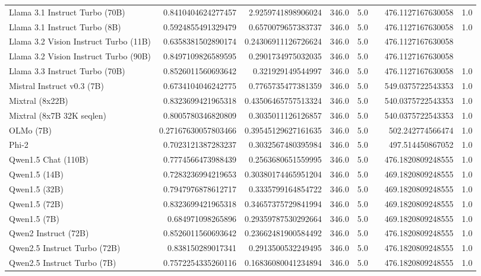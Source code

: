 \begin{table}[htp]
{\begin{tabular}{lrrrrrrr}
Llama 3.1 Instruct Turbo (70B) & 0.8410404624277457 & 2.9259741898906024 & 346.0 & 5.0 &  & 476.1127167630058 & 1.0 \\
Llama 3.1 Instruct Turbo (8B) & 0.5924855491329479 & 0.6570079657383737 & 346.0 & 5.0 &  & 476.1127167630058 & 1.0 \\
Llama 3.2 Vision Instruct Turbo (11B) & 0.6358381502890174 & 0.24306911126726624 & 346.0 & 5.0 &  & 476.1127167630058 &  \\
Llama 3.2 Vision Instruct Turbo (90B) & 0.8497109826589595 & 0.2901734975032035 & 346.0 & 5.0 &  & 476.1127167630058 &  \\
Llama 3.3 Instruct Turbo (70B) & 0.8526011560693642 & 0.321929149544997 & 346.0 & 5.0 &  & 476.1127167630058 & 1.0 \\
Mistral Instruct v0.3 (7B) & 0.6734104046242775 & 0.7765735477381359 & 346.0 & 5.0 &  & 549.0375722543353 & 1.0 \\
Mixtral (8x22B) & 0.8323699421965318 & 0.43506465757513324 & 346.0 & 5.0 &  & 540.0375722543353 & 1.0 \\
Mixtral (8x7B 32K seqlen) & 0.8005780346820809 & 0.3035011126126857 & 346.0 & 5.0 &  & 540.0375722543353 & 1.0 \\
OLMo (7B) & 0.27167630057803466 & 0.39545129627161635 & 346.0 & 5.0 &  & 502.242774566474 & 1.0 \\
Phi-2 & 0.7023121387283237 & 0.3032567480395984 & 346.0 & 5.0 &  & 497.514450867052 & 1.0 \\
Qwen1.5 Chat (110B) & 0.7774566473988439 & 0.2563680651559995 & 346.0 & 5.0 &  & 476.1820809248555 & 1.0 \\
Qwen1.5 (14B) & 0.7283236994219653 & 0.30380174465951204 & 346.0 & 5.0 &  & 469.1820809248555 & 1.0 \\
Qwen1.5 (32B) & 0.7947976878612717 & 0.3335799164854722 & 346.0 & 5.0 &  & 469.1820809248555 & 1.0 \\
Qwen1.5 (72B) & 0.8323699421965318 & 0.34657375729841994 & 346.0 & 5.0 &  & 469.1820809248555 & 1.0 \\
Qwen1.5 (7B) & 0.684971098265896 & 0.29359787530292664 & 346.0 & 5.0 &  & 469.1820809248555 & 1.0 \\
Qwen2 Instruct (72B) & 0.8526011560693642 & 0.23662481900584492 & 346.0 & 5.0 &  & 476.1820809248555 & 1.0 \\
Qwen2.5 Instruct Turbo (72B) & 0.838150289017341 & 0.2913500532249495 & 346.0 & 5.0 &  & 476.1820809248555 & 1.0 \\
Qwen2.5 Instruct Turbo (7B) & 0.7572254335260116 & 0.16836080041234894 & 346.0 & 5.0 &  & 476.1820809248555 & 1.0 \\

\end{tabular}}
\end{table}
